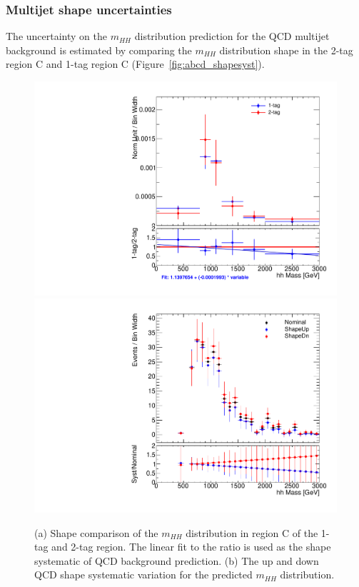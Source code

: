%
%
\subsubsection{Multijet shape uncertainties}
\label{sec:boosted_bkgd_qcdmultijet_shape_unc}
 
The uncertainty on the $m_{HH}$ distribution prediction for the QCD multijet background is estimated by comparing
the $m_{HH}$ distribution shape in the 2-tag region C and 1-tag region C (Figure~\ref{fig:abcd_shapesyst}).
 
\begin{figure}[!h]
\begin{center}
\includegraphics[scale=0.33]{./figures/boosted/ABCD/QCD_SR_hhMass.pdf}
\includegraphics[scale=0.33]{./figures/boosted/ABCD/Fit_QCD_SR_hhMass.pdf}
\caption{(a) Shape comparison of the $m_{HH}$ distribution in region C of the 1-tag and 2-tag region.
The linear fit to the ratio is used as the shape systematic of QCD background prediction.
(b) The up and down QCD shape systematic variation for the predicted $m_{HH}$ distribution.}
\label{fig:boosted_abcd_shapesyst}
\end{center}
\end{figure}


